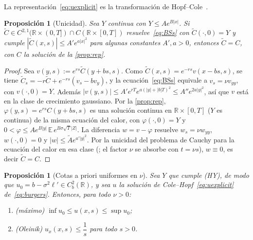 \documentclass[11pt,letterpaper]{article}
\theoremstyle{plain}
\newtheorem{proposicion}[theorem]{Proposición}
\theoremstyle{definition}
\theoremstyle{remark}
\numberwithin{equation}{section}
\newcommand{\R}{\mathbb{R}}
\newcommand{\E}{\mathbb{E}}
\begin{document}
	La representación~\eqref{eq:uexplicit} es la transformación de Hopf--Cole~\cite{Hopf1950,Cole1951}.
	
	\begin{proposicion}[Unicidad]\label{prop:unic}
		Sea \(Y\) continua con \(Y\le Ae^{B|x|}\). Si \(\tilde C\in C^{2,1}(\R\times(0,T])\cap C(\R\times[0,T])\) resuelve~\eqref{eq:BSs} con \(\tilde C(\cdot,0)=Y\) y cumple \(|\tilde C(x,s)|\le A'e^{a|x|^2}\) para algunas constantes \(A',a>0\), entonces \(\tilde C=C\), con \(C\) la solución de la \cref{prop:rep}.
	\end{proposicion}
	
	\begin{proof}
		Sea \(v(y,s):=e^{rs}\tilde C(y+bs,s)\). Como \(\tilde C(x,s)=e^{-rs}v(x-bs,s)\), se tiene \(\tilde C_s=-r\tilde C+e^{-rs}(v_s-bv_y)\), y la ecuación~\eqref{eq:BSs} equivale a \(v_s=\nu v_{yy}\), con \(v(\cdot,0)=Y\). Además \(|v(y,s)|\le A'e^{rT}e^{a(|y|+|b|T)^2}\le A''e^{2a|y|^2}\), así que \(v\) está en la clase de crecimiento gaussiano. Por la \cref{prop:rep}, \(\varphi(y,s)=e^{rs}C(y+bs,s)\) es una solución continua en \(\R\times[0,T]\) (\(Y\) es continua) de la misma ecuación del calor, con \(\varphi(\cdot,0)=Y\) y \(0<\varphi\le Ae^{B|y|}\,\E\,e^{B\sigma\sqrt T|Z|}\). La diferencia \(w=v-\varphi\) resuelve \(w_s=\nu w_{yy}\), \(w(\cdot,0)=0\) y \(|w|\le \tilde A e^{a'|y|^2}\). Por la unicidad del problema de Cauchy para la ecuación del calor en esa clase (\cite[Sec.~2.3, Teorema~7]{Evans2010}; el factor \(\nu\) se absorbe con \(t=\nu s\)), \(w\equiv0\), es decir \(\tilde C=C\).
	\end{proof}
	
	\begin{proposicion}[Cotas a priori uniformes en \(\nu\)]\label{prop:apriori}
		Sea \(Y\) que cumple (HY), de modo que \(u_0=b-\sigma^2\ell'\in C_b^2(\R)\), y sea \(u\) la solución de Cole--Hopf~\eqref{eq:uexplicit} de~\eqref{eq:burgers}. Entonces, para todo \(\nu>0\):
		
		\begin{enumerate}[label=(\alph*)]
			\item (máximo) \(\inf u_0\le u(x,s)\le\sup u_0\);
			\item (Oleinik) \(u_x(x,s)\le \dfrac{1}{s}\) para todo \(s>0\).
		\end{enumerate}
	\end{proposicion}
	
\end{document}
